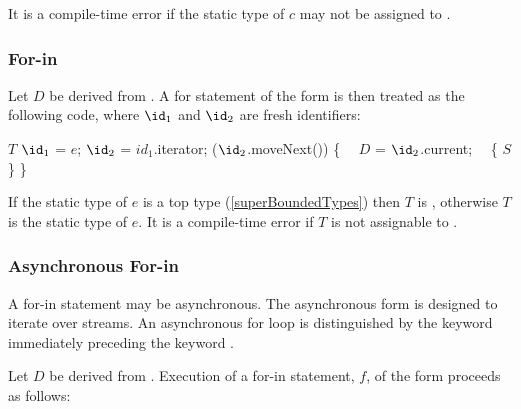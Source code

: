 \documentclass[makeidx]{article}
\begin{document}
{\LMHash{}%
It is a compile-time error if the static type of $c$ may not be assigned to .





\subsubsection{For-in}

\LMHash{}%
Let $D$ be derived from .
A for statement of the form 
is then treated as the following code,
where $\id_1$ and $\id_2$ are fresh identifiers:

\begin{normativeDartCode}
$T$ $\id_1$ = $e$;
\VAR{} $\id_2$ = $id_1$.iterator;
\WHILE{} ($\id_2$.moveNext()) \{
\ \ $D$ \id{} = $\id_2$.current;
\ \ \{ $S$ \}
\}
\end{normativeDartCode}

\noindent
If the static type of $e$ is a top type
(\ref{superBoundedTypes})
then $T$ is ,
otherwise $T$ is the static type of $e$.
It is a compile-time error if $T$ is not assignable to .



\subsubsection{Asynchronous For-in}

\LMHash{}%
A for-in statement may be asynchronous.
The asynchronous form is designed to iterate over streams.
An asynchronous for loop is distinguished by the keyword \AWAIT{} immediately preceding the keyword \FOR.

\LMHash{}%
Let $D$ be derived from .
Execution of a for-in statement, $f$, of the form
proceeds as follows:

}
\end{document}
